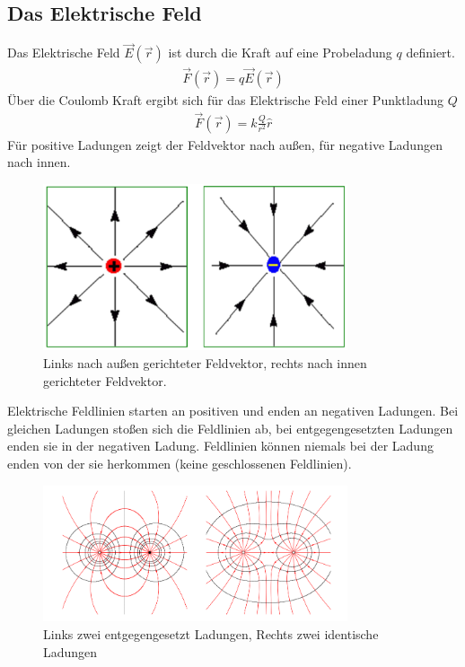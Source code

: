 \documentclass{article}
\begin{document}
\subsection{Das Elektrische Feld}
Das Elektrische Feld $\vec{E}(\vec{r})$ ist durch die Kraft auf eine Probeladung $q$ definiert.
\begin{align}
    \vec{F}(\vec{r})=q\vec{E}(\vec{r})
\end{align}
Über die Coulomb Kraft ergibt sich für das Elektrische Feld einer Punktladung $Q$
\begin{align}
    \vec{F}(\vec{r})=k\frac{Q}{r^2}\hat{r}
\end{align}
Für positive Ladungen zeigt der Feldvektor nach außen, für negative Ladungen nach innen.
\begin{figure}[H]
    \centering
    \includegraphics[width=0.80\textwidth]{Elektrisches Feld .png}
    \caption{Links nach außen gerichteter Feldvektor, rechts nach innen gerichteter Feldvektor.}
\end{figure}
Elektrische Feldlinien starten an positiven und enden an negativen Ladungen. 
Bei gleichen Ladungen stoßen sich die Feldlinien ab, bei entgegengesetzten Ladungen enden sie in der negativen Ladung.
Feldlinien können niemals bei der Ladung enden von der sie herkommen (keine geschlossenen Feldlinien).
\begin{figure}[H]
    \centering
    \includegraphics[width=0.80\textwidth]{Elektrisches Feld Ladungen.png}
    \caption{Links zwei entgegengesetzt Ladungen, Rechts zwei identische Ladungen}
\end{figure}
\end{document}
